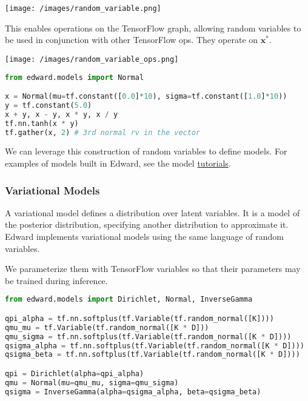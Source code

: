 \texttt{[image: /images/random\_variable.png]}

This enables operations on the TensorFlow graph, allowing random
variables to be used in conjunction with other TensorFlow ops. They
operate on $\mathbf{x}^*$.

\texttt{[image: /images/random\_variable\_ops.png]}

\begin{lstlisting}[language=Python]
from edward.models import Normal

x = Normal(mu=tf.constant([0.0]*10), sigma=tf.constant([1.0]*10))
y = tf.constant(5.0)
x + y, x - y, x * y, x / y
tf.nn.tanh(x * y)
tf.gather(x, 2) # 3rd normal rv in the vector
\end{lstlisting}

We can leverage this construction of random variables to define
models.
For examples of models built in Edward, see the model
\href{/tutorials/}{tutorials}.

\subsubsection{Variational Models}

A variational model defines a distribution over latent variables. It
is a model of the posterior distribution, specifying another
distribution to approximate it.
Edward implements variational models using the same language of random
variables.

We parameterize them with TensorFlow variables so that their
parameters may be trained during inference.

\begin{lstlisting}[language=Python]
from edward.models import Dirichlet, Normal, InverseGamma

qpi_alpha = tf.nn.softplus(tf.Variable(tf.random_normal([K])))
qmu_mu = tf.Variable(tf.random_normal([K * D]))
qmu_sigma = tf.nn.softplus(tf.Variable(tf.random_normal([K * D])))
qsigma_alpha = tf.nn.softplus(tf.Variable(tf.random_normal([K * D])))
qsigma_beta = tf.nn.softplus(tf.Variable(tf.random_normal([K * D])))

qpi = Dirichlet(alpha=qpi_alpha)
qmu = Normal(mu=qmu_mu, sigma=qmu_sigma)
qsigma = InverseGamma(alpha=qsigma_alpha, beta=qsigma_beta)
\end{lstlisting}
